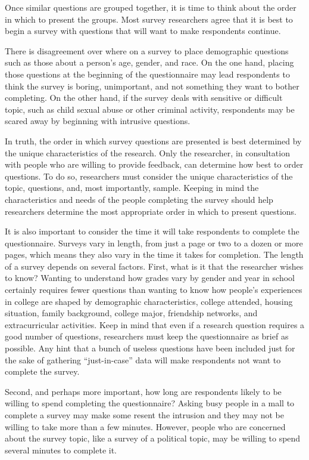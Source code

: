 Once similar questions are grouped together, it is time to think about the order in which to present the groups. Most survey researchers agree that it is best to begin a survey with questions that will want to make respondents continue\cite{dillman2011mail}. 

There is disagreement over where on a survey to place demographic questions such as those about a person's age, gender, and race. On the one hand, placing those questions at the beginning of the questionnaire may lead respondents to think the survey is boring, unimportant, and not something they want to bother completing. On the other hand, if the survey deals with sensitive or difficult topic, such as child sexual abuse or other criminal activity, respondents may be scared away by beginning with intrusive questions.

In truth, the order in which survey questions are presented is best determined by the unique characteristics of the research. Only the researcher, in consultation with people who are willing to provide feedback, can determine how best to order questions. To do so, researchers must consider the unique characteristics of the topic, questions, and, most importantly, sample. Keeping in mind the characteristics and needs of the people completing the survey should help researchers determine the most appropriate order in which to present questions.

It is also important to consider the time it will take respondents to complete the questionnaire. Surveys vary in length, from just a page or two to a dozen or more pages, which means they also vary in the time it takes for completion. The length of a survey depends on several factors. First, what is it that the researcher wishes to know? Wanting to understand how grades vary by gender and year in school certainly requires fewer questions than wanting to know how people’s experiences in college are shaped by demographic characteristics, college attended, housing situation, family background, college major, friendship networks, and extracurricular activities. Keep in mind that even if a research question requires a good number of questions, researchers must keep the questionnaire as brief as possible. Any hint that a bunch of useless questions have been included just for the sake of gathering ``just-in-case'' data will make respondents not want to complete the survey.

Second, and perhaps more important, how long are respondents likely to be willing to spend completing the questionnaire? Asking busy people in a mall to complete a survey may make some resent the intrusion and they may not be willing to take more than a few minutes. However, people who are concerned about the survey topic, like a survey of a political topic, may be willing to spend several minutes to complete it.

